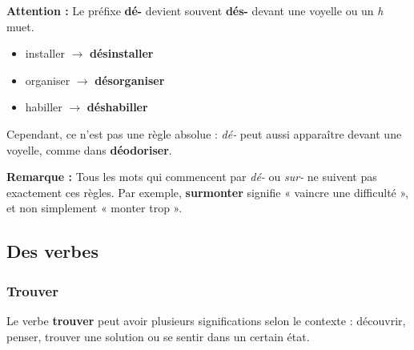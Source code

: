 \documentclass[math,code]{amznotes}
\theoremstyle{remark}
\begin{document}
\begin{notebox}
\textbf{Attention :} Le préfixe \textbf{dé-} devient souvent \textbf{dés-} devant une voyelle ou un \textit{h} muet.

\begin{itemize}
    \item installer $\rightarrow$ \textbf{désinstaller}
    \item organiser $\rightarrow$ \textbf{désorganiser}
    \item habiller $\rightarrow$ \textbf{déshabiller}
\end{itemize}

Cependant, ce n'est pas une règle absolue : \textit{dé-} peut aussi apparaître devant une voyelle, comme dans \textbf{déodoriser}.

\textbf{Remarque :} Tous les mots qui commencent par \textit{dé-} ou \textit{sur-} ne suivent pas exactement ces règles. Par exemple, \textbf{surmonter} signifie « vaincre une difficulté », et non simplement « monter trop ».
\end{notebox}


\subsection*{Des verbes}

\subsubsection*{Trouver}

Le verbe \textbf{trouver} peut avoir plusieurs significations selon le contexte : découvrir, penser, trouver une solution ou se sentir dans un certain état.
\end{document}
